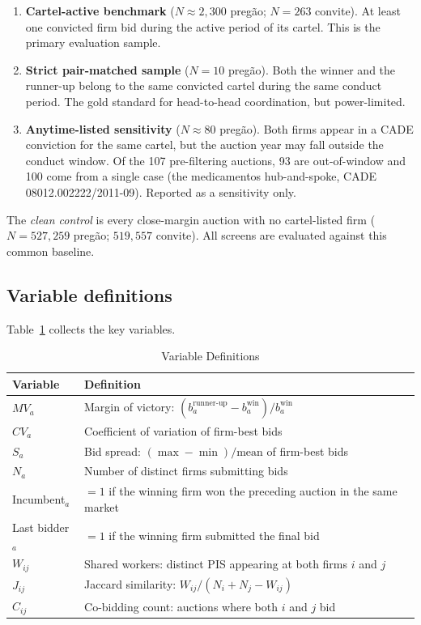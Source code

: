 \begin{enumerate}
\item \textbf{Cartel-active benchmark} ($N \approx 2{,}300$ preg\~{a}o; $N = 263$ convite). At least one convicted firm bid during the active period of its cartel. This is the primary evaluation sample.

\item \textbf{Strict pair-matched sample} ($N = 10$ preg\~{a}o). Both the winner and the runner-up belong to the same convicted cartel during the same conduct period. The gold standard for head-to-head coordination, but power-limited.

\item \textbf{Anytime-listed sensitivity} ($N \approx 80$ preg\~{a}o). Both firms appear in a CADE conviction for the same cartel, but the auction year may fall outside the conduct window. Of the 107 pre-filtering auctions, 93 are out-of-window and 100 come from a single case (the medicamentos hub-and-spoke, CADE 08012.002222/2011-09). Reported as a sensitivity only.
\end{enumerate}

The \emph{clean control} is every close-margin auction with no cartel-listed firm ($N = 527{,}259$ preg\~{a}o; $519{,}557$ convite). All screens are evaluated against this common baseline.

\subsection{Variable definitions}

Table~\ref{tab:variables} collects the key variables.

\begin{table}[htbp]
\centering
\caption{Variable Definitions}\label{tab:variables}
\begin{tabular}{lp{10cm}}
\toprule
Variable & Definition \\
\midrule
$MV_a$ & Margin of victory: $(b^{\text{runner-up}}_a - b^{\text{win}}_a) / b^{\text{win}}_a$ \\
$CV_a$ & Coefficient of variation of firm-best bids \\
$S_a$ & Bid spread: $(\max - \min) / \text{mean}$ of firm-best bids \\
$N_a$ & Number of distinct firms submitting bids \\
Incumbent$_a$ & $= 1$ if the winning firm won the preceding auction in the same market \\
Last bidder$_a$ & $= 1$ if the winning firm submitted the final bid \\
$W_{ij}$ & Shared workers: distinct PIS appearing at both firms $i$ and $j$ \\
$J_{ij}$ & Jaccard similarity: $W_{ij} / (N_i + N_j - W_{ij})$ \\
$C_{ij}$ & Co-bidding count: auctions where both $i$ and $j$ bid \\
\bottomrule
\end{tabular}
\end{table}
